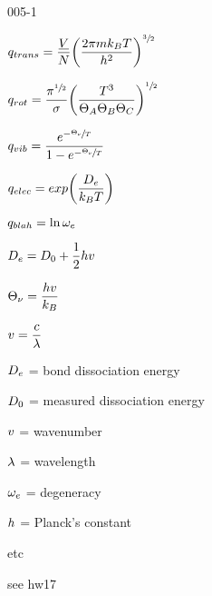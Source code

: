\begin{mitframe}{005-1} %

    
\begin{listone}
        
    \item $\tmpc = \dfrac{\uline{\vol}}{\nummoles}\bigg(\dfrac{2\pie\mass\boltz\Temp}{\planck^{2}}\bigg)^{\sfrac{3}{2}}$
        
    \item $\rmpc=\dfrac{\pie^{\sfrac{1}{2}}}{\molecrad}\bigg(\dfrac{\Temp^{3}}{\dimltemp_{A}\dimltemp_{B}\dimltemp_{C}}\bigg)^{\sfrac{1}{2}}$
        
    \item $\vmpc=\dfrac{\e^{-\sfrac{\vibrfreqfac}{\Temp}}}{1-\e^{-\sfrac{\vibrfreqfac}{\Temp}}}$
          
    \item $\empc=exp\bigg(\dfrac{\eneatom}{\boltz\Temp}\bigg)$   
   
    \item $q_{blah}=\ln\elecdegen$
        
	\item $\eneatom=\mbde+\dfrac{1}{2}\heattranscoeff\vvel$   
    
    \item $\vibrfreqfac=\dfrac{\heattranscoeff\vvel}{\boltz}$   
    
   	\item $\vvel=\dfrac{\lightspeed}{\wavel}$   
    
    \item $\eneatom$ = bond dissociation energy     
    \item $\mbde$ = measured dissociation energy    
    \item $\vvel$ = wavenumber           
    \item $\wavel$ = wavelength        
    \item $\elecdegen$ = degeneracy        
    \item $\heattranscoeff$ = Planck's constant             
    \item etc
    
    \item see hw17
    
    
\end{listone}			

\end{mitframe}